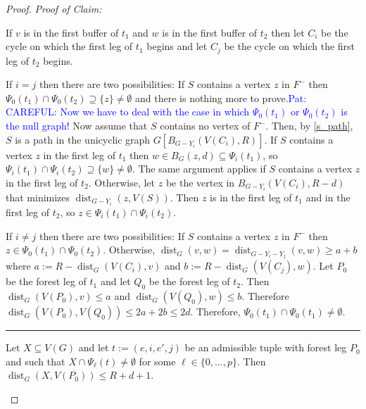 \documentclass{patmorin}
\newcommand{\pat}[1]{\textcolor{Blue}{Pat: #1}}
\newenvironment{clmproof}{\noindent\emph{Proof of Claim:}}{\hfill\rule{1ex}{1ex}\newline}
\DeclareMathOperator{\dist}{dist}
\begin{document}
\begin{proof}
\begin{clmproof}
\begin{compactitem}

      \item If $v$ is in the first buffer of $t_1$ and $w$ is in the first buffer of $t_2$ then let $C_i$ be the cycle on which the first leg of $t_1$ begins and let $C_j$ be the cycle on which the first leg of $t_2$ begins.  
      
      If $i=j$ then there are two possibilities:  If $S$ contains a vertex $z$ in $F^-$ then $\Psi_0(t_1)\cap\Psi_0(t_2)\supseteq\{z\}\neq\emptyset$ and there is nothing more to prove.\pat{CAREFUL: Now we have to deal with the case in which $\Psi_{0}(t_1)$ or $\Psi_0(t_2)$ is the null graph!} Now assume that $S$ contains no vertex of $F^-$. Then, by \cref{s_path}, $S$ is a path in the unicyclic graph $G[B_{G-Y_i}(V(C_i),R)]$.   If $S$ contains a vertex $z$ in the first leg of $t_1$ then $w\in B_G(z,d)\subseteq\Psi_i(t_1)$, so $\Psi_i(t_1)\cap\Psi_i(t_2)\supseteq\{w\}\neq\emptyset$.  The same argument applies if $S$ contains a vertex $z$ in the first leg of $t_2$.  Otherwise, let $z$ be the vertex in $B_{G-Y_i}(V(C_i),R-d)$ that minimizes $\dist_{G-Y_i}(z,V(S))$.  Then $z$ is in the first leg of $t_1$ and in the first leg of $t_2$, so $z\in\Psi_i(t_1)\cap\Psi_i(t_2)$. 
      
      If $i\neq j$ then there are two possibilities: If $S$ contains a vertex $z$ in $F^-$ then $z\in\Psi_0(t_1)\cap\Psi_0(t_2)$. Otherwise, $\dist_G(v,w)=\dist_{G-Y_i-Y_j}(v,w)\ge a+b$ where $a := R-\dist_G(V(C_i),v)$ and $b:=R-\dist_G(V(C_j),w)$. Let $P_0$ be the forest leg of $t_1$ and let $Q_0$ be the forest leg of $t_2$.  Then $\dist_G(V(P_0),v)\le a$ and $\dist_G(V(Q_0),w)\le b$.  Therefore $\dist_G(V(P_0),V(Q_0))\le 2a+2b\le 2d$.  Therefore, $\Psi_0(t_1)\cap\Psi_0(t_1)\neq\emptyset$.
  \end{compactitem}
\end{clmproof}


\begin{clm}
  Let $X\subseteq V(G)$ and let $t:=(e,i,e',j)$ be an admissible tuple with forest leg $P_0$ and such that $X\cap \Psi_\ell(t)\neq\emptyset$ for some $\ell\in\{0,\ldots,p\}$.  Then $\dist_G(X,V(P_0))\le R+d+1$.
\end{clm}


\end{proof}
\end{document}
